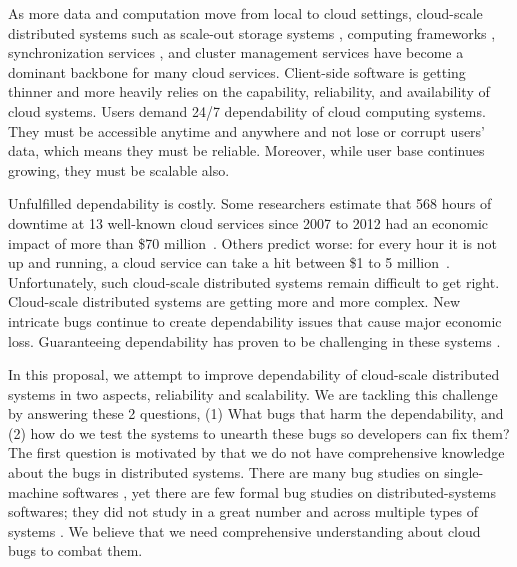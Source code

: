 As more data and computation move from local to cloud settings, cloud-scale
distributed systems such as scale-out storage systems \cite{Chang+06-BigTable,
DeCandia+07-Dynamo, Ghemawat+03-GoogleFS, Nightingale+12-FlatFDS}, computing
frameworks \cite{DeanGhemawat04-MapReduce, Murray+13-NaiadTimelyDataflow},
synchronization services \cite{Burrows06-Chubby, Hunt+10-ZooKeeperPaper}, and
cluster management services \cite{Hindman+11-Mesos, Kumar+13-Yarn} have become a
dominant backbone for many cloud services. Client-side software is getting
thinner and more heavily relies on the capability, reliability, and availability
of cloud systems. Users demand 24/7 dependability of cloud computing systems.
They must be accessible anytime and anywhere and not lose or corrupt users'
data, which means they must be reliable. Moreover, while user base continues
growing, they must be scalable also.

Unfulfilled dependability is costly. Some researchers estimate that 568 hours of
downtime at 13 well-known cloud services since 2007 to 2012 had an economic
impact of more than \$70 million~\cite{Essers12-70Million}. Others predict
worse: for every hour it is not up and running, a cloud service can take a hit
between \$1 to 5 million~\cite{Linthicum13-InfoworldCostOutages}.
Unfortunately, such cloud-scale distributed systems remain difficult to get
right. 
%
Cloud-scale distributed systems are getting more and more complex. New intricate
bugs continue to create dependability issues that cause major economic loss.
Guaranteeing dependability has proven to be challenging in these systems
\cite{Gunawi+11-FateDestini, Guo+11-Demeter, Wang+14-Exalt, Yang+09-Modist}.

In this proposal, we attempt to improve dependability of cloud-scale distributed
systems in two aspects, reliability and scalability. We are tackling this
challenge by answering these 2 questions, (1) What bugs that harm the
dependability, and (2) how do we test the systems to unearth these bugs so
developers can fix them? 
%
The first question is motivated by that we do not have comprehensive knowledge
about the bugs in distributed systems. There are many bug studies on
single-machine softwares \cite{Jin+12-PerformanceBugs,
Lu+08-ConcurrencyBugStudy, Palix+11-FaultsInLinux,
Sahoo+10-StudyBugsServerSoftware}, yet there are few formal bug studies on
distributed-systems softwares; they did not study in a great number and across
multiple types of systems \cite{Li+13-ScopeBugStudy, Xiao+14-NonDetMR}. We
believe that we need comprehensive understanding about cloud bugs to combat
them.

